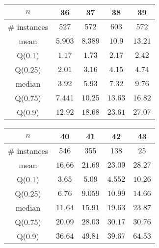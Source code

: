 \begin{tabular}{c|cccc} 
\hline 
$n$ & 36 & 37 & 38 & 39 \tabularnewline 
\hline 
\hline 
\# instances & $527$ & $572$ & $603$ & $572$ \tabularnewline 
mean & $5.903$ & $8.389$ & $10.9$ & $13.21$ \tabularnewline 
Q(0.1) & $1.17$ & $1.73$ & $2.17$ & $2.42$ \tabularnewline 
Q(0.25) & $2.01$ & $3.16$ & $4.15$ & $4.74$ \tabularnewline 
median & $3.92$ & $5.93$ & $7.32$ & $9.76$ \tabularnewline 
Q(0.75) & $7.441$ & $10.25$ & $13.63$ & $16.82$ \tabularnewline 
Q(0.9) & $12.92$ & $18.68$ & $23.61$ & $27.07$ \tabularnewline 
\hline 
\end{tabular} 
\medskip{} 

\begin{tabular}{c|cccc} 
\hline 
$n$ & 40 & 41 & 42 & 43 \tabularnewline 
\hline 
\hline 
\# instances & $546$ & $355$ & $138$ & $25$ \tabularnewline 
mean & $16.66$ & $21.69$ & $23.09$ & $28.27$ \tabularnewline 
Q(0.1) & $3.65$ & $5.09$ & $4.552$ & $10.26$ \tabularnewline 
Q(0.25) & $6.76$ & $9.059$ & $10.99$ & $14.66$ \tabularnewline 
median & $11.64$ & $15.91$ & $19.63$ & $23.87$ \tabularnewline 
Q(0.75) & $20.09$ & $28.03$ & $30.17$ & $30.76$ \tabularnewline 
Q(0.9) & $36.64$ & $49.81$ & $39.67$ & $64.53$ \tabularnewline 
\hline 
\end{tabular} 
\medskip{} 

